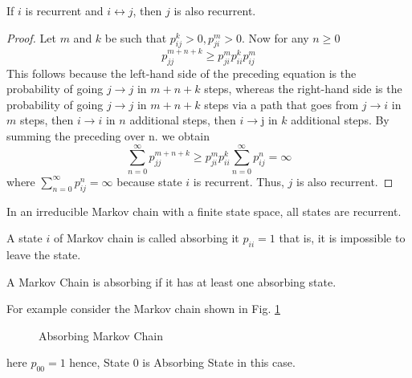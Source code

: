 \begin{theorem}[]
    \label{recurent if communicate}
    If $ i $ is recurrent and $ i\longleftrightarrow j $, then  $ j $ is also recurrent.
\end{theorem}
\begin{proof}
    Let $ m $ and  $ k $ be such that  $ p^{k}_{ij}>0,p^{m}_{ji}>0 $. Now for any $ n\ge 0 $
    \[
        p^{m+n+k}_{jj}\ge p^{m}_{ji}p^{k}_{ii}p^{m}_{ij}
    \]
    This follows because the left-hand side of the preceding equation is the probability of going $j \to j$ in $m+n+k$ steps,
      whereas the right-hand side is the probability of going $j \to j$ in $m+n+k$ steps
      via a path that goes from $j \to i$ in $m$ steps, then $i \to i$ in $n$ additional steps,
      then $i \to $j in $k$ additional steps. By summing the preceding over n. we obtain
    \[
        \sum_{n=0}^{\infty} p^{m+n+k}_{jj}\ge p^{m}_{ji}p^{k}_{ii} \sum_{n=0}^{\infty}  p^{n}_{ij} = \infty
    \]
     where $ \sum_{n=0}^{\infty}  p^{n}_{ij} = \infty $ because state $ i $ is recurrent. Thus, $j$ is also recurrent.
\end{proof}

\begin{proposition}
     In an irreducible Markov chain with a finite state space, all states are recurrent.
\end{proposition}

\begin{definition}
    A state $ i $ of Markov chain is called absorbing it  $ p_{ii} = 1 $ that is, it is impossible to leave 
    the state. 
\end{definition}

A Markov Chain is absorbing if it has at least one absorbing state.

For example consider the Markov chain shown in Fig. \ref{Absorving markov chain}

\begin{figure}[H]
    \centering
    \centering
    \caption{Absorbing Markov Chain}
    \label{Absorving markov chain}
\end{figure}

here $p_00=1$ hence, State 0 is Absorbing State in this case.
